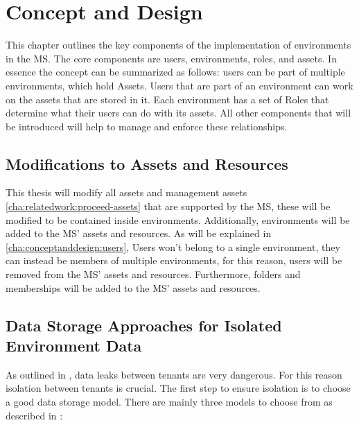 \chapter{Concept and Design}
\label{cha:conceptanddesign}

This chapter outlines the key components of the implementation of environments in the MS.
The core components are users, environments, roles, and assets.
In essence the concept can be summarized as follows: users can be part of multiple
environments, which hold Assets.
Users that are part of an environment can work on the assets that are stored in it.
Each environment has a set of Roles that determine what their users can do with its
assets.
All other components that will be introduced will help to manage and enforce these relationships.

\section{Modifications to Assets and Resources}

This thesis will modify all assets and management assets \ref{cha:relatedwork:proceed-assets}
that are supported by the MS,
these will be modified to be contained inside environments.
Additionally, environments will be added to the MS' assets and resources.
As will be explained in \ref{cha:conceptanddesign:users}, Users won't belong to a single
environment, they can instead be members of multiple environments, for this reason,
users will be removed from the MS' assets and resources.
Furthermore, folders and  memberships will be added to the MS' assets and
resources.

\section{Data Storage Approaches for Isolated Environment Data}

As outlined in \cite[3.3]{multi-tenant-dream-or-nightmare},
data leaks between tenants are very dangerous.
For this reason isolation between tenants is crucial.
The first step to ensure isolation is to choose a good data storage model.
There are mainly three models to choose from as described in
\cite[4.1]{Pushpan2024MultiTenantArchitecture}:

